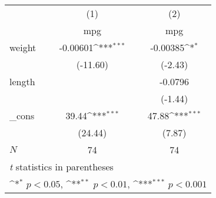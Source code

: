 {
\def\sym#1{\ifmmode^{#1}\else\(^{#1}\)\fi}
\begin{tabular}{l*{2}{c}}
\hline\hline
            &\multicolumn{1}{c}{(1)}&\multicolumn{1}{c}{(2)}\\
            &\multicolumn{1}{c}{mpg}&\multicolumn{1}{c}{mpg}\\
\hline
weight      &    -0.00601\sym{***}&    -0.00385\sym{*}  \\
            &    (-11.60)         &     (-2.43)         \\
[1em]
length      &                     &     -0.0796         \\
            &                     &     (-1.44)         \\
[1em]
\_cons      &       39.44\sym{***}&       47.88\sym{***}\\
            &     (24.44)         &      (7.87)         \\
\hline
\(N\)       &          74         &          74         \\
\hline\hline
\multicolumn{3}{l}{\footnotesize \textit{t} statistics in parentheses}\\
\multicolumn{3}{l}{\footnotesize \sym{*} \(p<0.05\), \sym{**} \(p<0.01\), \sym{***} \(p<0.001\)}\\
\end{tabular}
}
